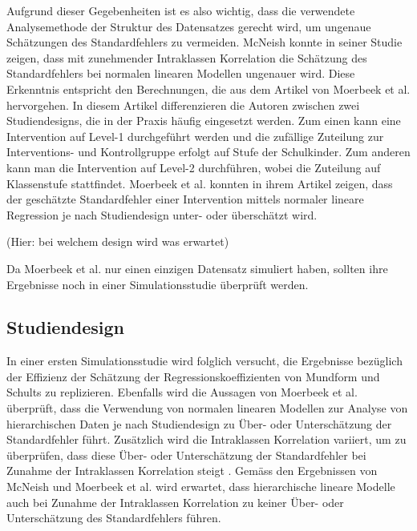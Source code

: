 \documentclass[12pt]{article}\usepackage[]{graphicx}\usepackage[]{color}
\begin{document}
Aufgrund dieser Gegebenheiten ist es also wichtig, dass die verwendete Analysemethode der Struktur des Datensatzes gerecht wird, um ungenaue Schätzungen des Standardfehlers zu vermeiden. McNeish \citeyearpar{mcneish2014analyzing} konnte in seiner Studie zeigen, dass mit zunehmender Intraklassen Korrelation die Schätzung des Standardfehlers bei normalen linearen Modellen ungenauer wird. Diese Erkenntnis entspricht den Berechnungen, die aus dem Artikel von Moerbeek et al. \citeyearpar{MOERBEEK2003341} hervorgehen. In diesem Artikel differenzieren die Autoren zwischen zwei Studiendesigns, die in der Praxis häufig eingesetzt werden. Zum einen kann eine Intervention auf Level-1 durchgeführt werden und die zufällige Zuteilung zur Interventions- und Kontrollgruppe erfolgt auf Stufe der Schulkinder. Zum anderen kann man die Intervention auf Level-2 durchführen, wobei die Zuteilung auf Klassenstufe stattfindet. Moerbeek et al. \citeyearpar{MOERBEEK2003341} konnten in ihrem Artikel zeigen, dass der geschätzte Standardfehler einer Intervention mittels normaler lineare Regression je nach Studiendesign unter- oder überschätzt wird. 

(Hier: bei welchem design wird was erwartet)

Da Moerbeek et al. \citeyearpar{MOERBEEK2003341} nur einen einzigen Datensatz simuliert haben, sollten ihre Ergebnisse noch in einer Simulationsstudie überprüft werden. 

\subsection{Studiendesign}
In einer ersten Simulationsstudie wird folglich versucht, die Ergebnisse bezüglich der Effizienz der Schätzung der Regressionskoeffizienten von Mundform und Schults \citeyearpar{mundfrom2002monte} zu replizieren. Ebenfalls wird die Aussagen von Moerbeek et al. \citeyearpar{MOERBEEK2003341} überprüft, dass die Verwendung von normalen linearen Modellen zur Analyse von hierarchischen Daten je nach Studiendesign zu Über- oder Unterschätzung der Standardfehler führt. Zusätzlich wird die Intraklassen Korrelation variiert, um zu überprüfen, dass diese Über- oder Unterschätzung der Standardfehler bei Zunahme der Intraklassen Korrelation steigt \citep{mcneish2014analyzing}. Gemäss den Ergebnissen von McNeish \citeyearpar{mcneish2014analyzing} und Moerbeek et al. \citeyearpar{MOERBEEK2003341} wird erwartet, dass hierarchische lineare Modelle auch bei Zunahme der Intraklassen Korrelation zu keiner Über- oder Unterschätzung des Standardfehlers führen. 
\end{document}
